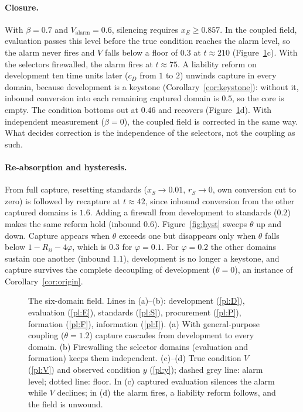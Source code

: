\documentclass[letterpaper]{article} %
\theoremstyle{definition}
\begin{document}
\paragraph{Closure.} With $\beta=0.7$ and $V_{\mathrm{alarm}}=0.6$, silencing requires $x_E\ge0.857$. In the coupled field, evaluation passes this level before the true condition reaches the alarm level, so the alarm never fires and $V$ falls below a floor of $0.3$ at $t\approx210$ (Figure~\ref{fig:field}c). With the selectors firewalled, the alarm fires at $t\approx75$. A liability reform on development ten time units later ($c_D$ from $1$ to $2$) unwinds capture in every domain, because development is a keystone (Corollary~\ref{cor:keystone}): without it, inbound conversion into each remaining captured domain is $0.5$, so the core is empty. The condition bottoms out at $0.46$ and recovers (Figure~\ref{fig:field}d). With independent measurement ($\beta=0$), the coupled field is corrected in the same way. What decides correction is the independence of the selectors, not the coupling as such.

\paragraph{Re-absorption and hysteresis.} From full capture, resetting standards ($x_S\to0.01$, $r_S\to0$, own conversion cut to zero) is followed by recapture at $t\approx42$, since inbound conversion from the other captured domains is $1.6$. Adding a firewall from development to standards ($0.2$) makes the same reform hold (inbound $0.6$). Figure~\ref{fig:hyst} sweeps $\theta$ up and down. Capture appears when $\theta$ exceeds one but disappears only when $\theta$ falls below $1-R_{ii}-4\varphi$, which is $0.3$ for $\varphi=0.1$. For $\varphi=0.2$ the other domains sustain one another (inbound $1.1$), development is no longer a keystone, and capture survives the complete decoupling of development ($\theta=0$), an instance of Corollary~\ref{cor:origin}.

\begin{figure}[t]
\centering

\caption{The six-domain field. Lines in (a)--(b): development (\ref{pl:D}), evaluation (\ref{pl:E}), standards (\ref{pl:S}), procurement (\ref{pl:P}), formation (\ref{pl:F}), information (\ref{pl:I}). (a) With general-purpose coupling ($\theta=1.2$) capture cascades from development to every domain. (b) Firewalling the selector domains (evaluation and formation) keeps them independent. (c)--(d) True condition $V$ (\ref{pl:V}) and observed condition $y$ (\ref{pl:y}); dashed grey line: alarm level; dotted line: floor. In (c) captured evaluation silences the alarm while $V$ declines; in (d) the alarm fires, a liability reform follows, and the field is unwound.}
\label{fig:field}
\end{figure}
\end{document}
